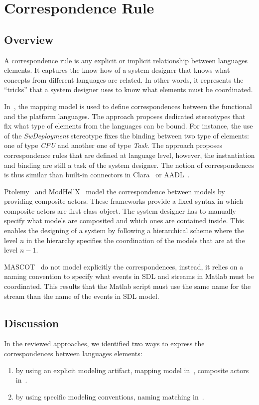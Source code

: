 \section{Correspondence Rule}
	\subsection{Overview}
A correspondence rule is any explicit or implicit relationship between languages elements. It captures the know-how of a system designer that knows what concepts from different languages are related. In other words, it represents the ``tricks'' that a system designer uses to know what elements must be coordinated. %

In~\cite{dinatale}, the mapping model is used to define correspondences between the functional and the platform languages. The approach proposes dedicated stereotypes that fix what type of elements from the languages can be bound. For instance, the use of the \emph{SwDeployment} stereotype fixes the binding between two type of elements: one of type \emph{CPU} and another one of type \emph{Task}. The approach proposes correspondence rules that are defined at language level, however, the instantiation and binding are still a task of the system designer. The notion of correspondences is thus similar than built-in connectors in Clara~\cite{clarabib} or AADL~\cite{aadlbib}. 
		
Ptolemy~\cite{ptoleframebib} and ModHel'X~\cite{modhelxbib} model the correspondence between models by providing composite actors. These frameworks provide a fixed syntax in which composite actors are first class object. The system designer has to manually specify what models are composited and which ones are contained inside. This enables the designing of a system by following a hierarchical scheme where the level $n$ in the hierarchy specifies the coordination of the models that are at the level $n-1$.

MASCOT~\cite{mascotbib} do not model explicitly the correspondences, instead, it relies on a naming convention to specify what events in SDL and streams in Matlab must be coordinated. This results that the Matlab script must use the same name for the stream than the name of the events in SDL model.  

\subsection{Discussion}
In the reviewed approaches, we identified two ways to express the correspondences between languages elements:
\begin{enumerate}
 \item by using an explicit modeling artifact, \eg mapping model in~\cite{dinatale}, composite actors in~\cite{modhelxbib, ptoleframebib}. 	
  \item by using specific modeling conventions, \eg naming matching in~\cite{mascotbib}.
\end{enumerate}
				
